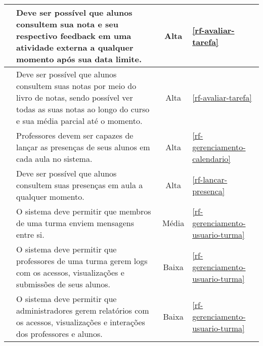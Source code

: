 \begin{longtable}{|c|p{10cm}|c|p{2cm}|}
	\RF\label{rf-consultar-nota-atividadeexterna} & Deve ser possível que alunos consultem sua nota e seu respectivo feedback em uma atividade externa a qualquer momento após sua data limite. & Alta & \ref{rf-avaliar-tarefa} \\ \hline 
	
	\RF\label{rf-consultar-notas} & Deve ser possível que alunos consultem suas notas por meio do livro de notas, sendo possível ver todas as suas notas ao longo do curso e sua média parcial até o momento. & Alta & \ref{rf-avaliar-tarefa} \\ \hline 
	
	\RF\label{rf-lancar-presenca}  & Professores devem ser capazes de lançar as presenças de seus alunos em cada aula no sistema. & 	Alta &  \ref{rf-gerenciamento-calendario} \\
	\hline 
	
	\RF\label{rf-consultar-presenca}  & Deve ser possível que alunos consultem suas presenças em aula a qualquer momento. & 	Alta &  \ref{rf-lancar-presenca} \\
	\hline 

	\RF\label{rf-enviar-mensagem}  & O sistema deve permitir que membros de uma turma enviem mensagens entre si. & 	Média &  \ref{rf-gerenciamento-usuario-turma} \\ \hline 
				
	\RF\label{rf-gerar-log-prof}  & O sistema deve permitir que professores de uma turma gerem logs com os acessos, visualizações e submissões de seus alunos. & Baixa &  \ref{rf-gerenciamento-usuario-turma} \\ \hline 
					
	\RF\label{rf-gerar-log-admin}  & O sistema deve permitir que administradores gerem relatórios com os acessos, visualizações e interações dos professores e alunos. & 	Baixa &  \ref{rf-gerenciamento-usuario-turma} \\ \hline 
\end{longtable}

\renewcommand*\thernfcount{RNF-\arabic{rnfcount}}
\newcommand*\RNF{\refstepcounter{rnfcount}\thernfcount}
\setcounter{rnfcount}{0}


